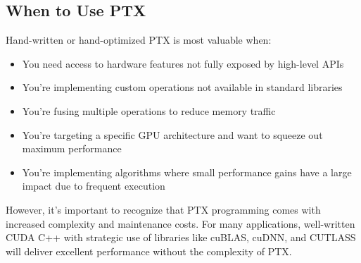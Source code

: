 \subsection{When to Use PTX}

Hand-written or hand-optimized PTX is most valuable when:

\begin{itemize}
    \item You need access to hardware features not fully exposed by high-level APIs
    \item You're implementing custom operations not available in standard libraries
    \item You're fusing multiple operations to reduce memory traffic
    \item You're targeting a specific GPU architecture and want to squeeze out maximum performance
    \item You're implementing algorithms where small performance gains have a large impact due to frequent execution
\end{itemize}

However, it's important to recognize that PTX programming comes with increased complexity and maintenance costs. For many applications, well-written CUDA C++ with strategic use of libraries like cuBLAS, cuDNN, and CUTLASS will deliver excellent performance without the complexity of PTX.

